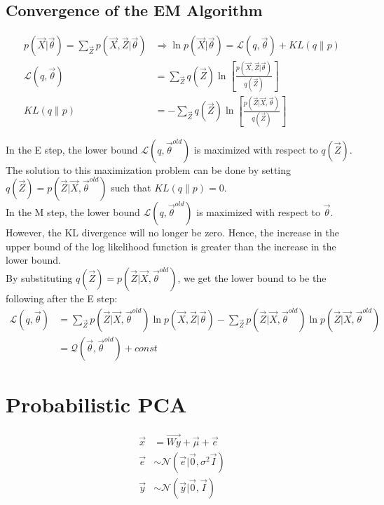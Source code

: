 \documentclass[12pt,twoside]{article}
\begin{document}
\subsection{Convergence of the EM Algorithm}

\begin{align*}
	p(\vec{X} \vert \vec{\theta}) = \sum_{\vec{Z}} p(\vec{X},\vec{Z} \vert \vec{\theta}) &\Rightarrow \ln p(\vec{X} \vert \vec{\theta}) = \mathcal{L}(q, \vec{\theta}) + KL(q\parallel p)\\
	\mathcal{L}(q, \vec{\theta})&=\sum_{\vec{Z}} q(\vec{Z})\ln \left[\frac{p(\vec{X}, \vec{Z}\vert \vec{\theta})}{q(\vec{Z})}\right]\\
	 KL(q\parallel p)&=-\sum_{\vec{Z}} q(\vec{Z})\ln \left[\frac{p(\vec{Z}\vert \vec{X}, \vec{\theta})}{q(\vec{Z})}\right]
\end{align*}

In the E step, the lower bound $\mathcal{L}(q,\vec{\theta}^{old})$ is maximized with respect to $q(\vec{Z})$. The solution to this maximization problem can be done by setting $q(\vec{Z}) = p (\vec{Z}\vert \vec{X}, \vec{\theta}^{old})$ such that $KL(q\parallel p)=0$.\\

In the M step, the lower bound $\mathcal{L}(q,\vec{\theta}^{old})$ is maximized with respect to $\vec{\theta}$. However, the KL divergence will no longer be zero. Hence, the increase in the upper bound of the log likelihood function is greater than the increase in the lower bound.\\

By substituting $q(\vec{Z}) = p(\vec{Z}\vert\vec{X}, \vec{\theta}^{old})$, we get the lower bound to be the following after the E step:
\begin{align*}
	\mathcal{L}(q,\vec{\theta}) & = \sum_{\vec{Z}}p(\vec{Z}\vert \vec{X}, \vec{\theta}^{old})\ln p(\vec{X},\vec{Z}\vert \vec{\theta}) - \sum_{\vec{Z}}p(\vec{Z}\vert \vec{X}, 	\vec{\theta}^{old})\ln p(\vec{Z} \vert \vec{X}, \vec{\theta}^{old})\\
	&= \mathcal{Q}(\vec{\theta},\vec{\theta}^{old} ) + const 
\end{align*}


\newpage

\section{Probabilistic PCA}

\begin{align*}
	\vec{x} &= \vec{Wy} + \vec{\mu} + \vec{e}\\
	\vec{e} & \sim \mathcal{N}(\vec{e}\vert \vec{0}, \sigma^2\vec{I})\\
	\vec{y} & \sim \mathcal{N}(\vec{y}\vert \vec{0}, \vec{I})
\end{align*}
\end{document}
